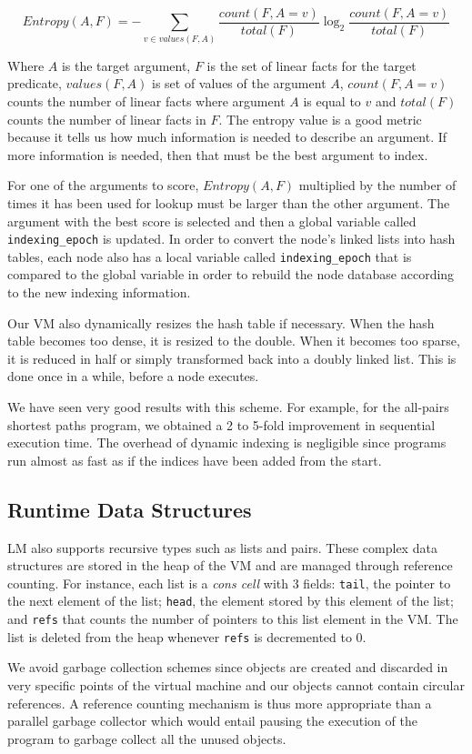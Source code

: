 {\tiny
\[
Entropy(A, F) = - \sum_{v \in values(F, A)} \frac{count(F, A = v)}{total(F)} \log_2 \frac{count(F, A = v)}{total(F)}
\]
}

Where $A$ is the target argument, $F$ is the set of linear facts
for the target predicate, $values(F, A)$ is set of values of the
argument $A$, $count(F, A = v)$ counts the number of linear facts
where argument $A$ is equal to $v$ and $total(F)$ counts the number of
linear facts in $F$.  The entropy value is a good metric because it
tells us how much information is needed to describe an argument.  If
more information is needed, then that must be the best argument to
index.

For one of the arguments to score, $Entropy(A, F)$ multiplied by the
number of times it has been used for lookup must be larger than the
other argument. The argument with the best score is selected and then
a global variable called \texttt{indexing\_epoch} is updated.  In
order to convert the node's linked lists into hash tables, each node
also has a local variable called \texttt{indexing\_epoch} that is
compared to the global variable in order to rebuild the node database
according to the new indexing information.

Our VM also dynamically resizes the hash table if necessary. When the
hash table becomes too dense, it is resized to the double. When it
becomes too sparse, it is reduced in half or simply transformed back
into a doubly linked list. This is done once in a while, before a node
executes.

We have seen very good results with this scheme. For example, for the
all-pairs shortest paths program, we obtained a 2 to 5-fold
improvement in sequential execution time.  The overhead of dynamic
indexing is negligible since programs run almost as fast as if the
indices have been added from the start.


\subsection{Runtime Data Structures}

LM also supports recursive types such as lists and pairs. These
complex data structures are stored in the heap of the VM and are
managed through reference counting. For instance, each list is
a \emph{cons cell} with 3 fields: \texttt{tail}, the pointer to the
next element of the list; \texttt{head}, the element stored by this
element of the list; and \texttt{refs} that counts the number of
pointers to this list element in the VM. The list is deleted from the
heap whenever \texttt{refs} is decremented to 0.

We avoid garbage collection schemes since objects are created and discarded
in very specific points of the virtual machine and our objects cannot contain circular references.
A reference counting mechanism is thus more appropriate than a parallel garbage collector which
would entail pausing the execution of the program to garbage collect all the unused objects.